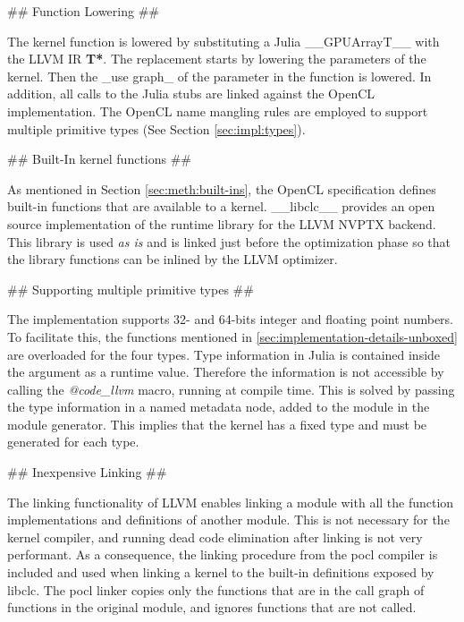 \begin{markdown}
## Function Lowering ##

The kernel function is lowered by substituting a Julia __GPUArray{T}__
with the LLVM IR \textbf{T*}. The replacement starts by lowering the
parameters of the kernel. Then the _use graph_ of the parameter in the
function is lowered. In addition, all calls to the Julia stubs are
linked against the OpenCL implementation. The OpenCL name mangling
rules are employed to support multiple primitive types (See Section
\ref{sec:impl:types}).

## Built-In kernel functions ##

As mentioned in Section \ref{sec:meth:built-ins}, the OpenCL
specification defines built-in functions that are available to a
kernel. __libclc__ \cite{libclc} provides an open source
implementation of the runtime library for the LLVM NVPTX backend. This
library is used \textit{as is} and is linked just before the
optimization phase so that the library functions can be inlined by the
LLVM optimizer.

## Supporting multiple primitive types ##
\label{sec:impl:types}

The implementation supports 32- and 64-bits integer and floating point
numbers. To facilitate this, the functions mentioned in
\ref{sec:implementation-details-unboxed} are overloaded for the four
types. Type information in Julia is contained inside the argument as a
runtime value. Therefore the information is not accessible by calling
the \textit{@code_llvm} macro, running at compile time. This is solved
by passing the type information in a named metadata node, added to the
module in the module generator. This implies that the kernel has a
fixed type and must be generated for each type.

## Inexpensive Linking ##

The linking functionality of \gls{LLVM} enables linking a module with
all the function implementations and definitions of another
module. This is not necessary for the kernel compiler, and running dead
code elimination after linking is not very performant. As a
consequence, the linking procedure from the \gls{pocl} \cite{pocl} compiler is
included and used when linking a kernel to the built-in definitions
exposed by libclc. The \gls{pocl} linker copies only the functions
that are in the call graph of functions in the original module, and
ignores functions that are not called.

\end{markdown}
